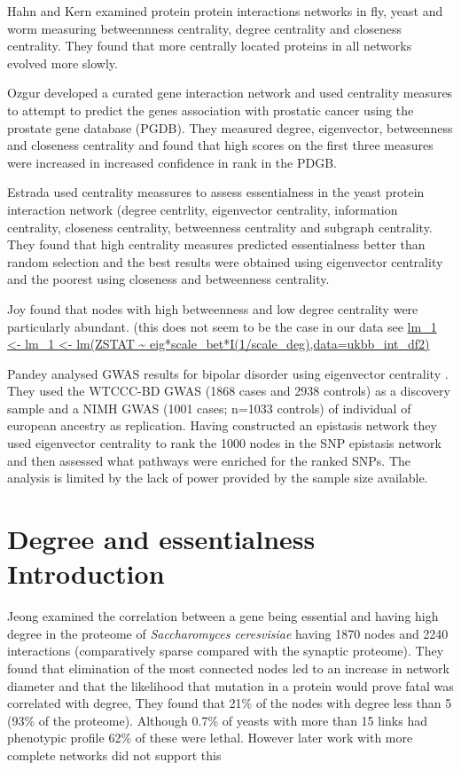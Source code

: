 Hahn and Kern\cite{hahn2005comparative} examined protein protein interactions networks in fly, yeast and worm measuring betweennness centrality, degree centrality and closeness centrality. They found that more centrally located proteins in all networks evolved more slowly. 

Ozgur \cite{ozgur2008identifying} developed a curated gene interaction network and used centrality measures to attempt to predict the genes association with prostatic cancer using the prostate gene database (PGDB). They measured degree, eigenvector, betweenness and closeness centrality and found that high scores on the first three measures were increased in increased confidence in rank in the PDGB.

Estrada \cite{estrada2006virtual} used centrality meassures to assess essentialness in the yeast protein interaction network (degree centrlity, eigenvector centrality, information centrality, closeness centrality, betweenness centrality and subgraph centrality. They found that high centrality measures predicted essentialness better than random selection and  the best results were obtained using eigenvector centrality and the poorest using closeness and betweenness centrality. 

Joy found that nodes with high betweenness and low degree centrality were particularly abundant.\cite{joy2005high} (this does not seem to be the case in our data see \url{lm_1 <- lm_1 <- lm(ZSTAT ~  eig*scale_bet*I(1/scale_deg),data=ukbb_int_df2)}

Pandey analysed GWAS results for bipolar disorder using eigenvector centrality \cite{pandey2012epistasis}. They used the WTCCC-BD GWAS (1868 cases and 2938 controls) as a discovery sample and  a NIMH GWAS (1001 cases; n=1033 controls) of individual of european ancestry as replication. Having constructed an epistasis network they used eigenvector centrality to rank the 1000 nodes in the SNP epistasis network and then assessed what pathways were enriched for the ranked SNPs. The analysis is limited by the lack of power provided by the sample size available.

\section{Degree and essentialness Introduction}
\label{sec:Degree and essentialness}
Jeong \cite{jeong2001lethality} examined the correlation between a gene being essential and having high degree in the proteome of \textit{Saccharomyces ceresvisiae} having 1870 nodes and 2240 interactions (comparatively sparse compared with the synaptic proteome). They found that elimination of the most connected nodes led to an increase in network diameter and that the likelihood that mutation in a protein would prove fatal was correlated with degree, They found that 21\% of the nodes with degree less than 5 (93\% of the proteome). Although 0.7\% of yeasts with more than 15 links had phenotypic profile 62\% of these were lethal. However later work with more complete networks did not support this \cite{milenkovic2011dominating} \cite{yu2008high}


